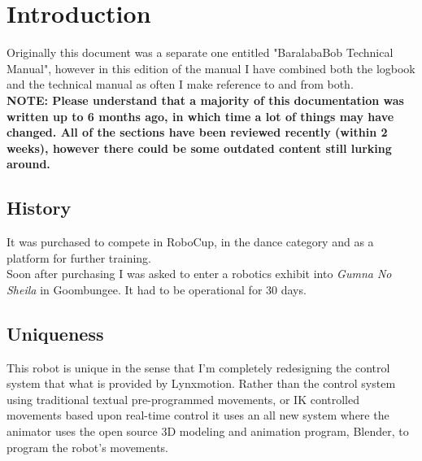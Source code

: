 	\chapter{Introduction}
    	Originally this document was a separate one entitled "BaralabaBob Technical Manual", however in this edition of the manual I have combined both the logbook and the technical manual as often I make reference to and from both.\\
        
        \textbf{NOTE: Please understand that a majority of this documentation was written up to 6 months ago, in which time a lot of things may have changed. All of the sections have been reviewed recently (within 2 weeks), however there could be some outdated content still lurking around.}\\
        
        \section{History}
			It was purchased to compete in RoboCup, in the dance category and as a platform for further training.\\
			
			Soon after purchasing I was asked to enter a robotics exhibit into \emph{Gumna No Sheila} in Goombungee. It had to be operational for 30 days.\\
        
        \section{Uniqueness}
			This robot is unique in the sense that I’m completely redesigning the control system that what is provided by Lynxmotion. Rather than the control system using traditional textual pre-programmed movements, or IK controlled movements based upon real-time control it uses an all new system where the animator uses the open source 3D modeling and animation program, Blender, to program the robot’s movements.              
        